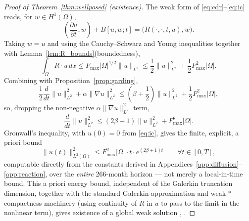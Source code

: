 \documentclass[journal]{IEEEtran}
\begin{document}
\begin{proof}[Proof of Theorem~\ref{thm:wellposed} (existence)]
The weak form of \eqref{eq:cdr}--\eqref{eq:ic} reads, for $w\in H^1(\Omega)$,
\begin{equation}
\left(\frac{\partial u}{\partial t},w\right) + B[u,w;t] = \big(R(\cdot,\cdot,t,u),w\big).
\end{equation}
Taking $w=u$ and using the Cauchy--Schwarz and Young inequalities together with Lemma~\ref{lem:R_bounds}(boundedness),
\begin{equation}
\int_\Omega R\cdot u\,dx \leq F_{\max}|\Omega|^{1/2}\|u\|_{L^2} \leq \frac{1}{2}\|u\|^2_{L^2} + \frac{1}{2}F_{\max}^2|\Omega|.
\end{equation}
Combining with Proposition~\ref{prop:garding},
\begin{equation}
\frac{1}{2}\frac{d}{dt}\|u\|^2_{L^2} + \alpha\|\nabla u\|^2_{L^2} \leq \left(\beta+\frac{1}{2}\right)\|u\|^2_{L^2} + \frac{1}{2}F_{\max}^2|\Omega|,
\end{equation}
so, dropping the non-negative $\alpha\|\nabla u\|^2_{L^2}$ term,
\begin{equation}
\frac{d}{dt}\|u\|^2_{L^2} \leq (2\beta+1)\|u\|^2_{L^2} + F_{\max}^2|\Omega|.
\end{equation}
Gronwall's inequality, with $u(0)=0$ from \eqref{eq:ic}, gives the finite, explicit, a priori bound
\begin{equation}
\|u(t)\|^2_{L^2(\Omega)} \leq F_{\max}^2|\Omega|\cdot t\cdot e^{(2\beta+1)t} \qquad \forall t\in[0,T],
\label{eq:apriori}
\end{equation}
computable directly from the constants derived in Appendices~\ref{app:diffusion}--\ref{app:reaction}, over the \emph{entire} 266-month horizon --- not merely a local-in-time bound. This a priori energy bound, independent of the Galerkin truncation dimension, together with the standard Galerkin-approximation and weak-$*$ compactness machinery (using continuity of $R$ in $u$ to pass to the limit in the nonlinear term), gives existence of a global weak solution \cite[Ch.~7]{evans2010}, \cite{pazy1983}.
\end{proof}
\end{document}
